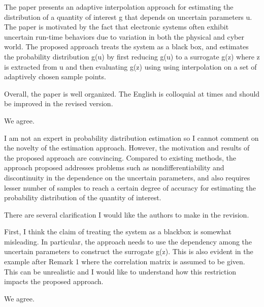 \begin{reviewer}
The paper presents an adaptive interpolation approach for estimating the
distribution of a quantity of interest g that depends on uncertain parameters u.
The paper is motivated by the fact that electronic systems often  exhibit
uncertain run-time behaviors due to variation in both the physical and cyber
world. The proposed approach treats the system as a black box, and estimates the
probability distribution g(u) by first reducing g(u) to a surrogate g(z) where z
is extracted from u and then evaluating g(z) using using interpolation on a set
of adaptively chosen sample points.

Overall, the paper is well organized. The English is colloquial at times and
should be improved in the revised version.
\end{reviewer}

\begin{authors}
We agree.

\begin{actions}
\end{actions}
\end{authors}

\begin{reviewer}
I am not an expert in probability distribution estimation so I cannot comment on
the novelty of the estimation approach. However, the motivation and results of
the proposed approach are convincing. Compared to existing methods, the approach
proposed addresses problems such as nondifferentiability and discontinuity in
the dependence on the uncertain parameters, and also requires lesser number of
samples to reach a certain degree of accuracy for estimating the probability
distribution of the quantity of interest.

There are several clarification I would like the authors to make in the
revision.

First, I think the claim of treating the system as a blackbox is somewhat
misleading. In particular, the approach needs to use the dependency among the
uncertain parameters to construct the surrogate g(z). This is also evident in
the example after Remark 1 where the correlation matrix is assumed to be given.
This can be unrealistic and I would like to understand how this restriction
impacts the proposed approach.
\end{reviewer}

\begin{authors}
We agree.

\begin{actions}
\end{actions}
\end{authors}

